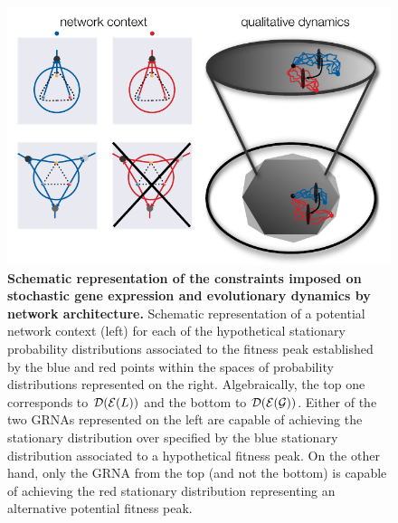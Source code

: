 \begin{figure}[!ht]
\centering
\noindent\includegraphics[width=0.9\columnwidth]{fig/stochdynscheme.pdf}
\caption{{\bf Schematic representation of the constraints imposed on stochastic gene expression and evolutionary dynamics by network architecture.} Schematic representation of a potential network context (left) for each of the hypothetical stationary probability distributions associated to the fitness peak established by the blue and red points within the spaces of probability distributions represented on the right. Algebraically, the top one corresponds to $\mathcal{D} (\mathcal{E} (L))$ and the bottom to $\mathcal{D} (\mathcal{E} (\mathcal{G}))$. Either of the two GRNAs represented on the left are capable of achieving the stationary distribution over \gnpm{} specified by the blue stationary distribution associated to a hypothetical fitness peak. On the other hand, only the GRNA from the top (and not the bottom) is capable of achieving the red stationary distribution representing an alternative potential fitness peak.}
\label{fig:stochdynscheme}
\end{figure}
